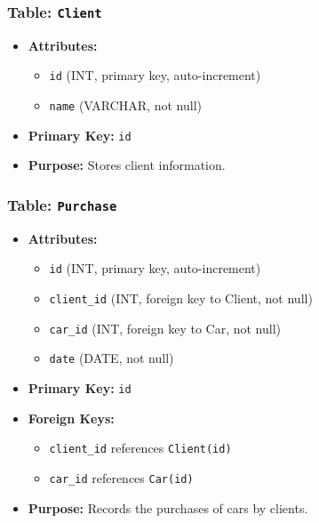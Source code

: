 \documentclass[11pt]{article}
\begin{document}
\subsubsection{Table: \texttt{Client}}
\label{sec:orgb9d78d6}
\begin{itemize}
\item \textbf{Attributes:}

\begin{itemize}
\item \texttt{id} (INT, primary key, auto-increment)
\item \texttt{name} (VARCHAR, not null)
\end{itemize}

\item \textbf{Primary Key:} \texttt{id}
\item \textbf{Purpose:} Stores client information.
\end{itemize}

\subsubsection{Table: \texttt{Purchase}}
\label{sec:orgbe5021f}
\begin{itemize}
\item \textbf{Attributes:}

\begin{itemize}
\item \texttt{id} (INT, primary key, auto-increment)
\item \texttt{client\_id} (INT, foreign key to Client, not null)
\item \texttt{car\_id} (INT, foreign key to Car, not null)
\item \texttt{date} (DATE, not null)
\end{itemize}

\item \textbf{Primary Key:} \texttt{id}
\item \textbf{Foreign Keys:}

\begin{itemize}
\item \texttt{client\_id} references \texttt{Client(id)}
\item \texttt{car\_id} references \texttt{Car(id)}
\end{itemize}

\item \textbf{Purpose:} Records the purchases of cars by clients.
\end{itemize}
\end{document}
